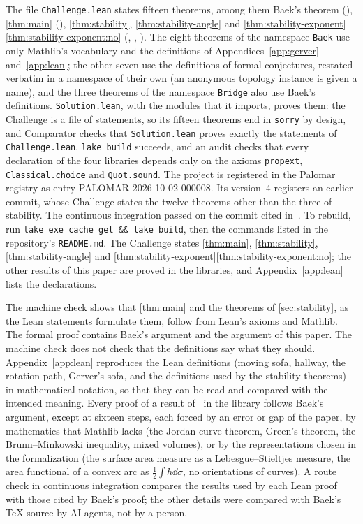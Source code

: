 The file \texttt{Challenge.lean} states fifteen theorems, among them Baek's
theorem (), \cref{thm:main}
(), \cref{thm:stability},
\cref{thm:stability-angle} and
\cref{thm:stability-exponent}\ref{thm:stability-exponent:no}
(, ,
). The eight theorems of the namespace
\texttt{Baek} use only Mathlib's vocabulary and the definitions of
Appendices~\ref{app:gerver} and~\ref{app:lean}; the other seven use the
definitions of formal-conjectures, restated verbatim in a namespace of their own
(an anonymous topology instance is given a name), and the three theorems of the
namespace \texttt{Bridge} also use Baek's definitions. \texttt{Solution.lean},
with the modules that it imports, proves them: the Challenge is a file of
statements, so its fifteen theorems end in \texttt{sorry} by design, and
Comparator checks that \texttt{Solution.lean} proves exactly the statements of
\texttt{Challenge.lean}. \texttt{lake build} succeeds, and an audit checks that
every declaration of the four libraries depends only on the axioms
\texttt{propext}, \texttt{Classical.choice} and \texttt{Quot.sound}. The project
is registered in the Palomar registry as entry PALOMAR-2026-10-02-000008. Its
version~4 registers an earlier commit, whose Challenge states the twelve
theorems other than the three of stability. The continuous integration passed on
the commit cited in~\cite{Companion}. To rebuild, run \texttt{lake exe cache get
\&\& lake build}, then the commands listed in the repository's
\texttt{README.md}. The Challenge states \cref{thm:main}, \cref{thm:stability},
\cref{thm:stability-angle} and
\cref{thm:stability-exponent}\ref{thm:stability-exponent:no}; the other results
of this paper are proved in the libraries, and Appendix~\ref{app:lean} lists the
declarations.

The machine check shows that \cref{thm:main} and the theorems of
\cref{sec:stability}, as the Lean statements formulate them, follow from Lean's
axioms and Mathlib. The formal proof contains Baek's argument and the argument
of this paper. The machine check does not check that the definitions say what
they should. Appendix~\ref{app:lean} reproduces the Lean definitions (moving
sofa, hallway, the rotation path, Gerver's sofa, and the definitions used by the
stability theorems) in mathematical notation, so that they can be read and
compared with the intended meaning. Every proof of a result of~\cite{Baek} in
the library follows Baek's argument, except at sixteen steps, each forced by an
error or gap of the paper, by mathematics that Mathlib lacks (the Jordan curve
theorem, Green's theorem, the Brunn--Minkowski inequality, mixed volumes), or by
the representations chosen in the formalization (the surface area measure as a
Lebesgue--Stieltjes measure, the area functional of a convex arc as $\frac12\int
h\dd\sigma$, no orientations of curves). A route check in continuous integration
compares the results used by each Lean proof with those cited by Baek's proof;
the other details were compared with Baek's TeX source by AI agents, not by a
person.

